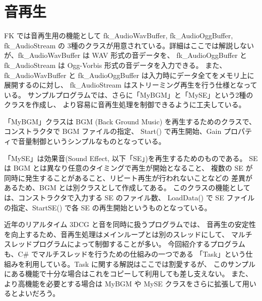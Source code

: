 \begin{breakbox}
\begin{small}
\begin{verbatim}

\end{verbatim}
\end{small}
\end{breakbox}

\section{音再生}

FK では音再生用の機能として fk\_AudioWavBuffer, fk\_AudioOggBuffer, fk\_AudioStream の
3種のクラスが用意されている。詳細はここでは解説しないが、fk\_AudioWavBuffer は WAV 形式の音データを、
fk\_AudioOggBuffer と fk\_AudioStream は Ogg-Vorbis 形式の音データを入力できる。
また、fk\_AudioWavBuffer と fk\_AudioOggBuffer は入力時にデータ全てをメモリ上に展開するのに対し、
fk\_AudioStream はストリーミング再生を行う仕様となっている。
サンプルプログラムでは、さらに「MyBGM」と「MySE」という2種のクラスを作成し、
より容易に音再生処理を制御できるように工夫している。

「MyBGM」クラスは BGM (Back Ground Music) を再生するためのクラスで、
コンストラクタで BGM ファイルの指定、
Start() で再生開始、Gain プロパティで音量制御というシンプルなものとなっている。

「MySE」は効果音(Sound Effect, 以下「SE」)を再生するためのものである。
SE は BGM とは異なり任意のタイミングで再生が開始となること、
複数の SE が同時に発生することがあること、リピート再生が行われないことなどの
差異があるため、BGM とは別クラスとして作成してある。
このクラスの機能としては、コンストラクタで入力する SE のファイル数、
LoadData() で SE ファイルの指定、StartSE() で各 SE の再生開始というものとなっている。

近年のリアルタイム 3DCG と音を同時に扱うプログラムでは、
音再生の安定性を向上するため、音再生処理はメインループとは別のスレッドにして、
マルチスレッドプログラムによって制御することが多い。
今回紹介するプログラムも、C\# でマルチスレッドを行うための仕組みの一つである
「Task」という仕組みを利用している。Task に関する解説はここでは割愛するが、
このサンプルにある機能で十分な場合はこれをコピーして利用しても差し支えない。
また、より高機能を必要とする場合は MyBGM や MySE クラスをさらに拡張して用いるとよいだろう。
\\ ~

